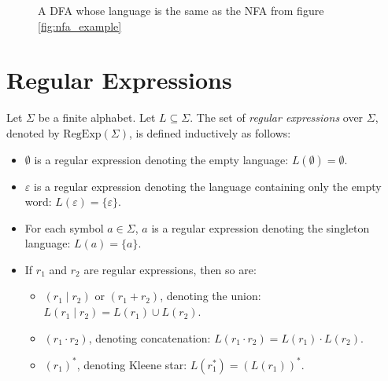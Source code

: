 \begin{figure}[H]
\centering
{}
\caption{A DFA whose language is the same as the NFA from figure \ref{fig:nfa_example}} 
\end{figure}

\section{Regular Expressions}
Let $\Sigma$ be a finite alphabet. Let $L \subseteq \Sigma$. The set of \emph{regular expressions} over $\Sigma$, denoted by $\text{RegExp}(\Sigma)$, is defined inductively as follows:

\begin{itemize}
    \item $\emptyset$ is a regular expression denoting the empty language: $L(\emptyset) = \emptyset$.
    \item $\varepsilon$ is a regular expression denoting the language containing only the empty word: $L(\varepsilon) = \{ \varepsilon \}$.
    \item For each symbol $a \in \Sigma$, $a$ is a regular expression denoting the singleton language: $L(a) = \{ a \}$.
    \item If $r_1$ and $r_2$ are regular expressions, then so are:
    \begin{itemize}
        \item $(r_1 \mid r_2)$ or $(r_1 + r_2)$, denoting the union: $L(r_1 \mid r_2) = L(r_1) \cup L(r_2)$.
        \item $(r_1 \cdot r_2)$, denoting concatenation: $L(r_1 \cdot r_2) = L(r_1) \cdot L(r_2)$.
        \item $(r_1)^*$, denoting Kleene star: $L(r_1^*) = (L(r_1))^*$.
    \end{itemize}
\end{itemize}

